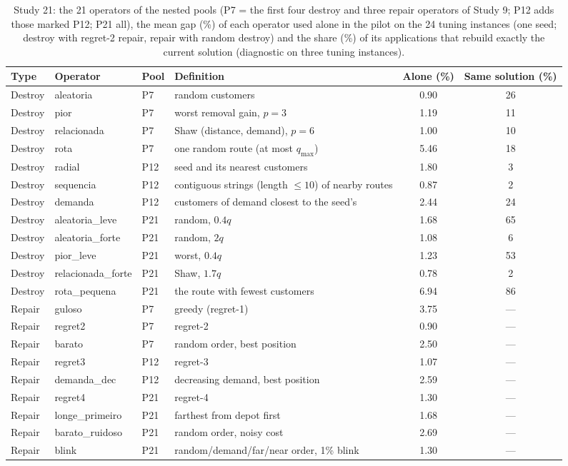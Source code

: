 \begin{table}[t]
\caption{Study 21: the 21 operators of the nested pools (P7 = the first four destroy and three repair operators of Study 9; P12 adds those marked P12; P21 all), the mean gap (\%) of each operator used alone in the pilot on the 24 tuning instances (one seed; destroy with regret-2 repair, repair with random destroy) and the share (\%) of its applications that rebuild exactly the current solution (diagnostic on three tuning instances).}\label{tab:s21p}
\centering
\small
\begin{adjustbox}{max width=\linewidth}
\begin{tabular}{llllcc}
\toprule
Type & Operator & Pool & Definition & Alone (\%) & Same solution (\%) \\
\midrule
Destroy & aleatoria & P7 & random customers & 0.90 & 26 \\
Destroy & pior & P7 & worst removal gain, $p=3$ & 1.19 & 11 \\
Destroy & relacionada & P7 & Shaw (distance, demand), $p=6$ & 1.00 & 10 \\
Destroy & rota & P7 & one random route (at most $q_{\max}$) & 5.46 & 18 \\
Destroy & radial & P12 & seed and its nearest customers & 1.80 & 3 \\
Destroy & sequencia & P12 & contiguous strings (length $\le10$) of nearby routes & 0.87 & 2 \\
Destroy & demanda & P12 & customers of demand closest to the seed's & 2.44 & 24 \\
Destroy & aleatoria\_leve & P21 & random, $0.4q$ & 1.68 & 65 \\
Destroy & aleatoria\_forte & P21 & random, $2q$ & 1.08 & 6 \\
Destroy & pior\_leve & P21 & worst, $0.4q$ & 1.23 & 53 \\
Destroy & relacionada\_forte & P21 & Shaw, $1.7q$ & 0.78 & 2 \\
Destroy & rota\_pequena & P21 & the route with fewest customers & 6.94 & 86 \\
Repair & guloso & P7 & greedy (regret-1) & 3.75 & --- \\
Repair & regret2 & P7 & regret-2 & 0.90 & --- \\
Repair & barato & P7 & random order, best position & 2.50 & --- \\
Repair & regret3 & P12 & regret-3 & 1.07 & --- \\
Repair & demanda\_dec & P12 & decreasing demand, best position & 2.59 & --- \\
Repair & regret4 & P21 & regret-4 & 1.30 & --- \\
Repair & longe\_primeiro & P21 & farthest from depot first & 1.68 & --- \\
Repair & barato\_ruidoso & P21 & random order, noisy cost & 2.69 & --- \\
Repair & blink & P21 & random/demand/far/near order, 1\% blink & 1.30 & --- \\
\bottomrule
\end{tabular}
\end{adjustbox}
\end{table}
